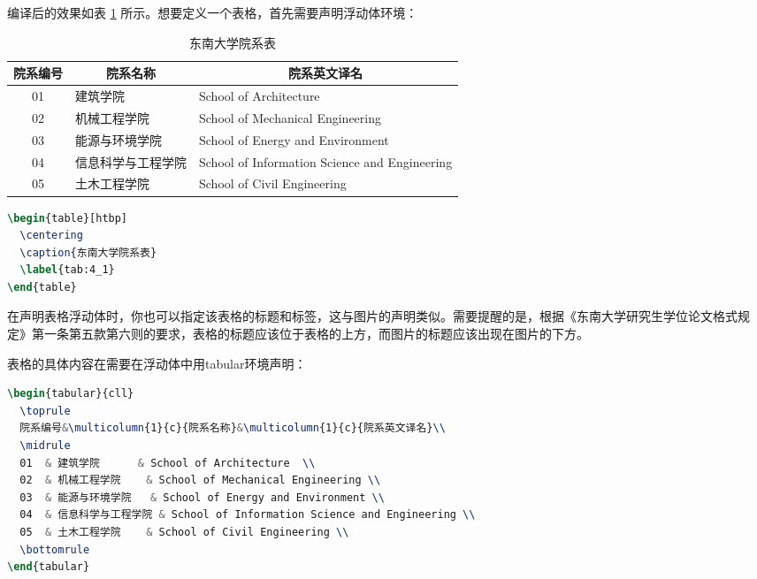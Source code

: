 \noindent 编译后的效果如表 \ref{tab:4_1} 所示。想要定义一个表格，首先需要声明浮动体环境：

\begin{table}[htbp]
\centering
\caption{东南大学院系表}
\label{tab:4_1}
\begin{tabular}{cll}
\toprule
院系编号 & \multicolumn{1}{c}{院系名称}       & \multicolumn{1}{c}{院系英文译名 }     \\
\midrule
01                       & 建筑学院      & School of Architecture                        \\
02                       & 机械工程学院    & School of Mechanical Engineering              \\
03                       & 能源与环境学院   & School of Energy and Environment              \\
04                       & 信息科学与工程学院 & School of Information Science and Engineering \\
05                       & 土木工程学院    & School of Civil Engineering \\
\bottomrule
\end{tabular}
\end{table}

\begin{tcolorbox}
\begin{lstlisting}[language=TeX]
\begin{table}[htbp]
  \centering
  \caption{东南大学院系表}
  \label{tab:4_1}
\end{table}
\end{lstlisting}
\end{tcolorbox}

\noindent 在声明表格浮动体时，你也可以指定该表格的标题和标签，这与图片的声明类似。需要提醒的是，根据《东南大学研究生学位论文格式规定》\cite{seugs2015rule}第一条第五款第六则的要求，表格的标题应该位于表格的上方，而图片的标题应该出现在图片的下方。

表格的具体内容在需要在浮动体中用{\codefont tabular}环境声明：

\begin{tcolorbox}
\begin{lstlisting}[language=TeX]
\begin{tabular}{cll}
  \toprule
  院系编号&\multicolumn{1}{c}{院系名称}&\multicolumn{1}{c}{院系英文译名}\\
  \midrule
  01  & 建筑学院      & School of Architecture  \\
  02  & 机械工程学院    & School of Mechanical Engineering \\
  03  & 能源与环境学院   & School of Energy and Environment \\
  04  & 信息科学与工程学院 & School of Information Science and Engineering \\
  05  & 土木工程学院    & School of Civil Engineering \\
  \bottomrule
\end{tabular}
\end{lstlisting}
\end{tcolorbox}

